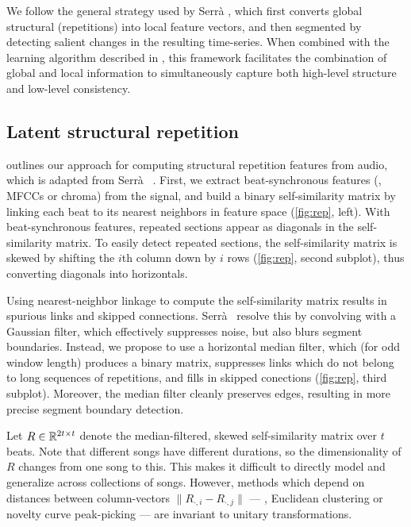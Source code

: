 \documentclass{article}
\begin{document}
We follow the general strategy used by Serr\`{a} \etal, which first converts global structural (repetitions) into
local feature vectors, and then segmented by detecting salient changes in the resulting time-series. 
When combined with the learning algorithm described in , this framework facilitates the 
combination of global and local information to simultaneously capture both high-level structure and low-level 
consistency.

\subsection{Latent structural repetition}
 outlines our approach for computing structural repetition features from audio, which is adapted from
Serr\`{a} \etal~\cite{serra2012unsupervised}.  First, we extract beat-synchronous features (\eg, MFCCs or chroma) 
from the signal, and build a binary self-similarity matrix by linking each beat to its nearest neighbors in feature
space (\cref{fig:rep}, left). With beat-synchronous features, repeated sections appear as diagonals in the self-similarity
matrix. To easily detect repeated sections, the self-similarity matrix is skewed by shifting the $i$th column down by $i$ rows
(\cref{fig:rep}, second subplot), thus converting diagonals into horizontals.

Using nearest-neighbor linkage to compute the self-similarity matrix results in spurious links and skipped connections. 
Serr\`{a}~\etal{} resolve this by convolving with a Gaussian filter, which effectively suppresses noise, but also blurs
segment boundaries. Instead, we propose to use a horizontal median filter, which (for odd window length) produces a binary matrix,
suppresses links which do not belong to long sequences of repetitions, and fills in skipped conections (\cref{fig:rep}, third
subplot). Moreover, the median filter cleanly preserves edges, resulting in more precise segment boundary detection.

Let $R \in \mathbb{R}^{2t \times t}$ denote the median-filtered, skewed self-similarity matrix over $t$ beats.  
Note that different songs have different durations, so the dimensionality of $R$ changes from one song to this. 
This makes it difficult to directly model and generalize across collections of songs.
However, methods which depend on distances between column-vectors ${\|R_{\cdot, i} - R_{\cdot, j}\|}$ --- 
\eg, Euclidean clustering or novelty curve peak-picking --- are invariant to unitary transformations.
\end{document}
